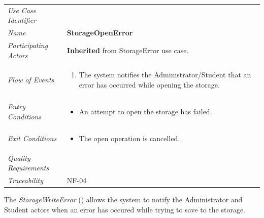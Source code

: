 \documentclass[12pt,letterpaper]{article}
\begin{document}
\begin{center}
	\begin{tabu} to 
		\toprule
		Use Case Identifier & \storageopenerror{} \\
		Name & {\bf StorageOpenError} \\
		Participating Actors & \textbf{Inherited} from StorageError use case. \\
		Flow of Events & 
		\begin{minipage}[t]{\linewidth}
		    \begin{enumerate}
			    \item The system notifies the Administrator/Student that an error has occurred while opening the storage.
			\end{enumerate}
		\end{minipage} \\

		Entry Conditions &
		\begin{minipage}[t]{\linewidth}
			\begin{itemize}
			    \item An attempt to open the storage has failed.
	        \end{itemize}
		\end{minipage} \\

		Exit Conditions &
		\begin{minipage}[t]{\linewidth}
			\begin{itemize}
			    \item The open operation is cancelled.
	        \end{itemize}
		\end{minipage} \\

		Quality Requirements & \\

		Traceability & NF-04 \\
		\toprule
	\end{tabu}
\end{center}

\newpage{}

The {\it StorageWriteError} ({\bf \storagewriteerror{}}) allows the system to notify the Administrator and Student actors when an error has occured while trying to save to the storage.
\end{document}
